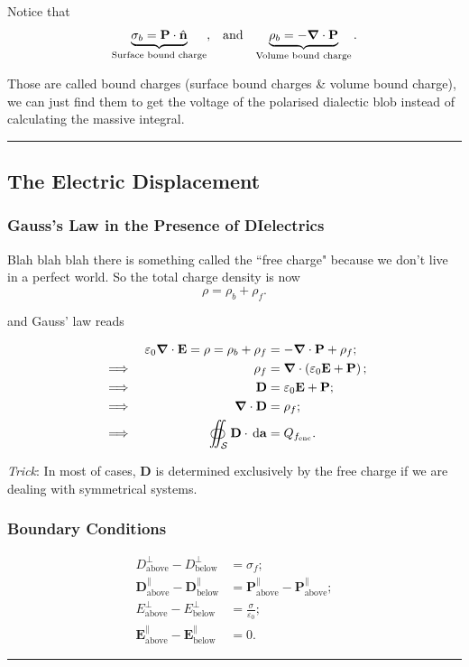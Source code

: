 \documentclass[a4paper]{article}
\newcommand{\dmr}[1]{\, \mathrm{d}#1} %
\numberwithin{equation}{subsection}
\let\oldhat\hat
\renewcommand{\vec}[1]{\mathbf{#1}}
\renewcommand{\hat}[1]{\oldhat{\mathbf{#1}}}
\begin{document}
Notice that 
\begin{align*}
    \underbrace{\sigma_{b} = \vec{P} \cdot \hat{n}}_{\text{Surface bound charge}}, &&\text{and}&& \underbrace{\rho_b = -\grad \cdot \vec{P}}_{\text{Volume bound charge}}.
\end{align*}

Those are called bound charges (surface bound charges \& volume bound charge), we can just find them to get the voltage of the polarised dialectic blob instead of calculating the massive integral.

\par\noindent\rule{\textwidth}{0.4pt}
\subsection{The Electric Displacement}
\subsubsection{Gauss's Law in the Presence of DIelectrics}
Blah blah blah there is something called the ``free charge" because we don't live in a perfect world. So the total charge density is now
\[
    \rho = \rho_b + \rho_f.
\]

and Gauss' law reads

\begin{align}
     && \varepsilon_0 \grad \cdot \vec{E} = \rho = \rho_b + \rho_f &= -\grad\cdot\vec{P} + \rho_f;\nonumber \\
    &\implies& \rho_f &= \grad\cdot\left(\varepsilon_0 \vec{E} + \vec{P}\right);\nonumber \\
    &\implies& \vec{D} &= \varepsilon_0 \vec{E} + \vec{P};\\
    &\implies& \grad \cdot \vec{D} &= \rho_f;\\
    &\implies& \oiint_{\mathcal{S}} \vec{D} \cdot \dmr{\vec{a}} &= Q_{f_{\text{enc}}}.
\end{align}

\textit{Trick}: In most of cases, $\vec{D}$ is determined exclusively by the free charge if we are dealing with symmetrical systems.
\subsubsection{Boundary Conditions}
\begin{align}
    D^{\bot}_{\text{above}}-D^{\bot}_{\text{below}} &= \sigma_f;\\
    \vec{D}^{\parallel}_{\text{above}}-\vec{D}^{\parallel}_{\text{below}} &= \vec{P}^{\parallel}_{\text{above}}-\vec{P}^{\parallel}_{\text{above}};\\
    E^{\bot}_{\text{above}}-E^{\bot}_{\text{below}} &= \frac{\sigma}{\varepsilon_0};\\
    \vec{E}^{\parallel}_{\text{above}}-\vec{E}^{\parallel}_{\text{below}} &=0.
\end{align}
\par\noindent\rule{\textwidth}{0.4pt}
\end{document}
